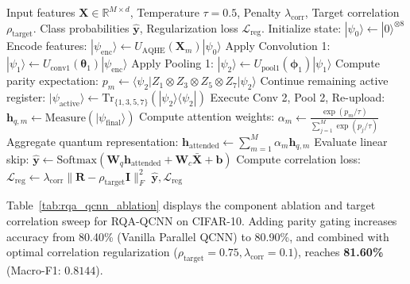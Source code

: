\documentclass[10pt,twocolumn,twoside,a4paper]{article}
\newcommand{\ket}[1]{|#1\rangle}
\newcommand{\bra}[1]{\langle#1|}
\newcommand{\sandwich}[3]{\langle#1|#2|#3\rangle}
\begin{document}
\begin{algorithm}[t]
\caption{Forward Pass of Recycled-Qubit Attention QCNN}
\label{alg:rqa_forward}
\begin{algorithmic}[1]
\Require Input features $\mathbf{X} \in \mathbb{R}^{M \times d}$, Temperature $\tau=0.5$, Penalty $\lambda_{\text{corr}}$, Target correlation $\rho_{\text{target}}$.
\Ensure Class probabilities $\hat{\mathbf{y}}$, Regularization loss $\mathcal{L}_{\text{reg}}$.
    \State Initialize state: $\ket{\psi_0} \gets \ket{0}^{\otimes 8}$
    \State Encode features: $\ket{\psi_{\text{enc}}} \gets U_{\text{AQHE}}(\mathbf{X}_m) \ket{\psi_0}$
    \State Apply Convolution 1: $\ket{\psi_1} \gets U_{\text{conv1}}(\boldsymbol{\theta}_1) \ket{\psi_{\text{enc}}}$
    \State Apply Pooling 1: $\ket{\psi_2} \gets U_{\text{pool1}}(\boldsymbol{\phi}_1) \ket{\psi_1}$
    \State Compute parity expectation: $p_m \gets \sandwich{\psi_2}{Z_1 \otimes Z_3 \otimes Z_5 \otimes Z_7}{\psi_2}$
    \State Continue remaining active register: $\ket{\psi_{\text{active}}} \gets \text{Tr}_{\{1,3,5,7\}}(\ket{\psi_2}\bra{\psi_2})$
    \State Execute Conv 2, Pool 2, Re-upload: $\mathbf{h}_{q, m} \gets \text{Measure}(\ket{\psi_{\text{final}}})$
\EndFor
\State Compute attention weights: $\alpha_m \gets \frac{\exp(p_m / \tau)}{\sum_{j=1}^M \exp(p_j / \tau)}$
\State Aggregate quantum representation: $\mathbf{h}_{\text{attended}} \gets \sum_{m=1}^M \alpha_m \mathbf{h}_{q, m}$
\State Evaluate linear skip: $\hat{\mathbf{y}} \gets \text{Softmax}\left(\mathbf{W}_q \mathbf{h}_{\text{attended}} + \mathbf{W}_c \bar{\mathbf{X}} + \mathbf{b}\right)$
\State Compute correlation loss: $\mathcal{L}_{\text{reg}} \gets \lambda_{\text{corr}} \|\mathbf{R} - \rho_{\text{target}}\mathbf{I}\|_F^2$
\State \Return $\hat{\mathbf{y}}, \mathcal{L}_{\text{reg}}$
\end{algorithmic}
\end{algorithm}

Table~\ref{tab:rqa_qcnn_ablation} displays the component ablation and target correlation sweep for RQA-QCNN on CIFAR-10. Adding parity gating increases accuracy from 80.40\% (Vanilla Parallel QCNN) to 80.90\%, and combined with optimal correlation regularization ($\rho_{\text{target}} = 0.75, \lambda_{\text{corr}} = 0.1$), reaches \textbf{81.60\%} (Macro-F1: $0.8144$).
\end{document}
